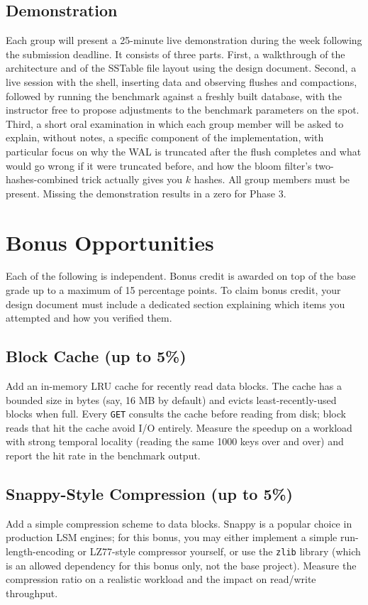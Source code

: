 \documentclass[11pt,a4paper]{article}
\begin{document}
\subsection{Demonstration}
Each group will present a 25-minute live demonstration during the week following the submission deadline. It consists of three parts. First, a walkthrough of the architecture and of the SSTable file layout using the design document. Second, a live session with the shell, inserting data and observing flushes and compactions, followed by running the benchmark against a freshly built database, with the instructor free to propose adjustments to the benchmark parameters on the spot. Third, a short oral examination in which each group member will be asked to explain, without notes, a specific component of the implementation, with particular focus on why the WAL is truncated after the flush completes and what would go wrong if it were truncated before, and how the bloom filter's two-hashes-combined trick actually gives you $k$ hashes. All group members must be present. Missing the demonstration results in a zero for Phase 3.

\section{Bonus Opportunities}

Each of the following is independent. Bonus credit is awarded on top of the base grade up to a maximum of 15 percentage points. To claim bonus credit, your design document must include a dedicated section explaining which items you attempted and how you verified them.

\subsection{Block Cache (up to 5\%)}
Add an in-memory LRU cache for recently read data blocks. The cache has a bounded size in bytes (say, 16 MB by default) and evicts least-recently-used blocks when full. Every \texttt{GET} consults the cache before reading from disk; block reads that hit the cache avoid I/O entirely. Measure the speedup on a workload with strong temporal locality (reading the same 1000 keys over and over) and report the hit rate in the benchmark output.

\subsection{Snappy-Style Compression (up to 5\%)}
Add a simple compression scheme to data blocks. Snappy is a popular choice in production LSM engines; for this bonus, you may either implement a simple run-length-encoding or LZ77-style compressor yourself, or use the \texttt{zlib} library (which is an allowed dependency for this bonus only, not the base project). Measure the compression ratio on a realistic workload and the impact on read/write throughput.
\end{document}
